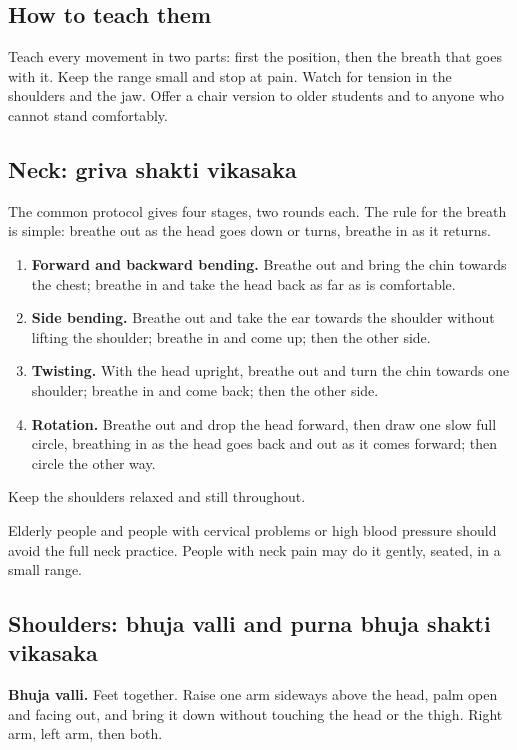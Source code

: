 \subsection*{How to teach them}
Teach every movement in two parts: first the position, then the breath that goes with it. Keep the range small and stop at pain. Watch for tension in the shoulders and the jaw. Offer a chair version to older students and to anyone who cannot stand comfortably.

\subsection*{Neck: griva shakti vikasaka}
The common protocol gives four stages, two rounds each. The rule for the breath is simple: breathe out as the head goes down or turns, breathe in as it returns.
\begin{enumerate}
\item \textbf{Forward and backward bending.} Breathe out and bring the chin towards the chest; breathe in and take the head back as far as is comfortable.
\item \textbf{Side bending.} Breathe out and take the ear towards the shoulder without lifting the shoulder; breathe in and come up; then the other side.
\item \textbf{Twisting.} With the head upright, breathe out and turn the chin towards one shoulder; breathe in and come back; then the other side.
\item \textbf{Rotation.} Breathe out and drop the head forward, then draw one slow full circle, breathing in as the head goes back and out as it comes forward; then circle the other way.
\end{enumerate}
Keep the shoulders relaxed and still throughout.

\begin{caution}
Elderly people and people with cervical problems or high blood pressure should avoid the full neck practice. People with neck pain may do it gently, seated, in a small range.
\end{caution}


\subsection*{Shoulders: bhuja valli and purna bhuja shakti vikasaka}
\textbf{Bhuja valli.} Feet together. Raise one arm sideways above the head, palm open and facing out, and bring it down without touching the head or the thigh. Right arm, left arm, then both.

